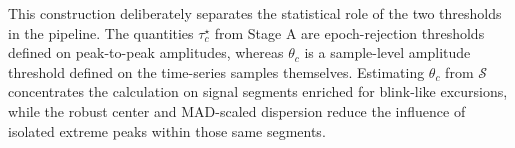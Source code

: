 This construction deliberately separates the statistical role of the two
thresholds in the pipeline. The quantities \(\tau_c^\star\) from Stage A are
epoch-rejection thresholds defined on peak-to-peak amplitudes, whereas
\(\theta_c\) is a sample-level amplitude threshold defined on the time-series
samples themselves. Estimating \(\theta_c\) from \(\mathcal{S}\) concentrates
the calculation on signal segments enriched for blink-like excursions, while
the robust center and MAD-scaled dispersion reduce the influence of isolated
extreme peaks within those same segments.

